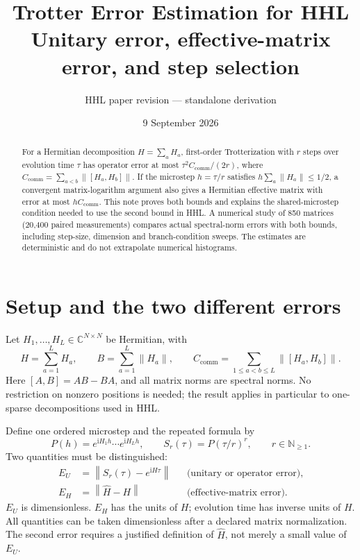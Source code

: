 \documentclass[11pt,a4paper]{article}
\title{Trotter Error Estimation for HHL\\[4pt]\large Unitary error, effective-matrix error, and step selection}
\author{HHL paper revision --- standalone derivation}
\date{9 September 2026}
\newcommand{\norm}[1]{\left\lVert #1\right\rVert}
\newcommand{\ii}{\mathrm{i}}
\newcommand{\CC}{C_{\mathrm{comm}}}
\begin{document}
\maketitle
\begin{abstract}
For a Hermitian decomposition $H=\sum_a H_a$, first-order Trotterization with $r$ steps over evolution time $\tau$ has operator error at most $\tau^2\CC/(2r)$, where $\CC=\sum_{a<b}\norm{[H_a,H_b]}$. If the microstep $h=\tau/r$ satisfies $h\sum_a\norm{H_a}\leq1/2$, a convergent matrix-logarithm argument also gives a Hermitian effective matrix with error at most $h\CC$. This note proves both bounds and explains the shared-microstep condition needed to use the second bound in HHL. A numerical study of 850 matrices (20,400 paired measurements) compares actual spectral-norm errors with both bounds, including step-size, dimension and branch-condition sweeps. The estimates are deterministic and do not extrapolate numerical histograms.
\end{abstract}

\section{Setup and the two different errors}
Let $H_1,\ldots,H_L\in\mathbb C^{N\times N}$ be Hermitian, with
\begin{equation}
 H=\sum_{a=1}^L H_a,\qquad
 B=\sum_{a=1}^L\norm{H_a},\qquad
 \CC=\sum_{1\leq a<b\leq L}\norm{[H_a,H_b]}.
\end{equation}
Here $[A,B]=AB-BA$, and all matrix norms are spectral norms. No restriction on nonzero positions is needed; the result applies in particular to one-sparse decompositions used in HHL.

Define one ordered microstep and the repeated formula by
\begin{equation}
 P(h)=e^{\ii H_1h}\cdots e^{\ii H_Lh},\qquad
 S_r(\tau)=P(\tau/r)^r,\qquad r\in\mathbb N_{\geq1}.
\end{equation}
Two quantities must be distinguished:
\begin{align}
 E_U&=\norm{S_r(\tau)-e^{\ii H\tau}}
 &&\text{(unitary or operator error)},\\
 E_H&=\norm{\widehat H-H}
 &&\text{(effective-matrix error)}.
\end{align}
$E_U$ is dimensionless. $E_H$ has the units of $H$; evolution time has inverse units of $H$. All quantities can be taken dimensionless after a declared matrix normalization. The second error requires a justified definition of $\widehat H$, not merely a small value of $E_U$.
\end{document}
